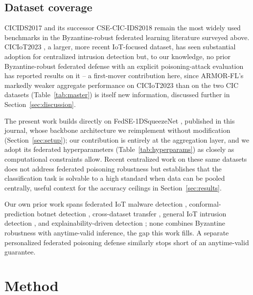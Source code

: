 \documentclass[pdflatex,iicol,sn-mathphys-num]{sn-jnl}%
\theoremstyle{thmstyleone}%
\theoremstyle{thmstyletwo}%
\theoremstyle{thmstylethree}%
\begin{document}
\subsection{Dataset coverage}

CICIDS2017 \citep{sharafaldin2018cicids} and its successor CSE-CIC-IDS2018 remain the most widely used benchmarks in the Byzantine-robust federated learning literature surveyed above. CICIoT2023 \citep{neto2023ciciot2023}, a larger, more recent IoT-focused dataset, has seen substantial adoption for centralized intrusion detection \citep{wahab2025multiclass,wakili2025resilient} but, to our knowledge, no prior Byzantine-robust federated defense with an explicit poisoning-attack evaluation has reported results on it -- a first-mover contribution here, since ARMOR-FL's markedly weaker aggregate performance on CICIoT2023 than on the two CIC datasets (Table~\ref{tab:master}) is itself new information, discussed further in Section~\ref{sec:discussion}.

The present work builds directly on FedSE-1DSqueezeNet \citep{zhou2026fedse1dsqueezenet}, published in this journal, whose backbone architecture we reimplement without modification (Section~\ref{sec:setup}); our contribution is entirely at the aggregation layer, and we adopt its federated hyperparameters (Table~\ref{tab:hyperparams}) as closely as computational constraints allow. Recent centralized work on these same datasets \citep{xu2025fewshot,zhang2025transformer,palani2026comparative,xue2025haehrl,sireesha2026lightweight,zhao2024gan} does not address federated poisoning robustness but establishes that the classification task is solvable to a high standard when data can be pooled centrally, useful context for the accuracy ceilings in Section~\ref{sec:results}.

Our own prior work spans federated IoT malware detection \citep{dang2024iotmalwarefl}, conformal-prediction botnet detection \citep{dang2024conformalbotnet}, cross-dataset transfer \citep{dang2023transferids}, general IoT intrusion detection \citep{dang2022iotids,dang2022mlids}, and explainability-driven detection \citep{dang2021explainableids}; none combines Byzantine robustness with anytime-valid inference, the gap this work fills. A separate personalized federated poisoning defense \citep{thein2024pflids} similarly stops short of an anytime-valid guarantee.

\section{Method}\label{sec:method}
\end{document}
